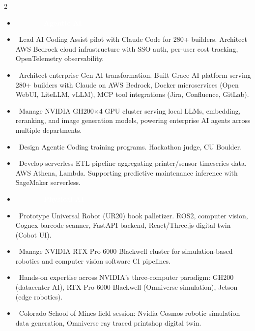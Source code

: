 \documentclass[10pt,letter,ragged2e,withhyper]{altacv}
\begin{document}
\begin{paracol}{2}


\begin{itemize}[leftmargin=1.8em, itemindent=-1.8em]
\item[] ~~~~~~~\colorbox{accent}{\textcolor{white}{\textbf{~Agentic AI~}}} \textcolor{accent}{\faUserCog\faUserTie\faUserSecret\faUserNinja}
\item[] \faCode ~Lead AI Coding Assist pilot with Claude Code for 280+ builders. Architect AWS Bedrock cloud infrastructure with SSO auth, per-user cost tracking, OpenTelemetry observability.
\item[] \faRocket ~Architect enterprise Gen AI transformation. Built Grace AI platform serving 280+ builders with Claude on AWS Bedrock, Docker microservices (Open WebUI, LiteLLM, vLLM), MCP tool integrations (Jira, Confluence, GitLab).
\item[] \faServer ~Manage NVIDIA GH200$\times$4 GPU cluster serving local LLMs, embedding, reranking, and image generation models, powering enterprise AI agents across multiple departments.
\item[] \faChalkboardTeacher ~Design Agentic Coding training programs. Hackathon judge, CU Boulder.
\item[] \faUpload ~Develop serverless ETL pipeline aggregating printer/sensor timeseries data. AWS Athena, Lambda. Supporting predictive maintenance inference with SageMaker serverless.
\item[] ~~~~~~~\colorbox{accent}{\textcolor{white}{\textbf{~Physical AI~}}} \textcolor{accent}{\faRobot\faApple\faMicrochip\faCogs}
\item[] \faRobot ~Prototype Universal Robot (UR20) book palletizer. ROS2, computer vision, Cognex barcode scanner, FastAPI backend, React/Three.js digital twin (Cobot UI).
\item[] \faServer ~Manage NVIDIA RTX Pro 6000 Blackwell cluster for simulation-based robotics and computer vision software CI pipelines.
\item[] \faMicrochip ~Hands-on expertise across NVIDIA's three-computer paradigm: GH200 (datacenter AI), RTX Pro 6000 Blackwell (Omniverse simulation), Jetson (edge robotics).
\item[] \faIndustry ~Colorado School of Mines field session: Nvidia Cosmos robotic simulation data generation, Omniverse ray traced printshop digital twin.
\end{itemize}


\end{paracol}
\end{document}
